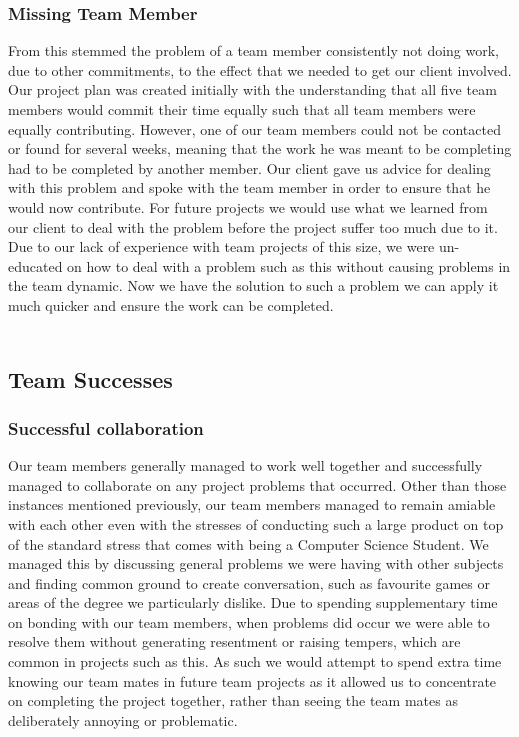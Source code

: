 \documentclass{l3proj}
\begin{document}
\subsubsection{Missing Team Member}
From this stemmed the problem of a team member consistently not doing work, due to other commitments, to the effect that we needed to get our client involved. Our project plan was created initially with the understanding that all five team members would commit their time equally such that all team members were equally contributing. However, one of our team members could not be contacted or found for several weeks, meaning that the work he was meant to be completing had to be completed by another member. Our client gave us advice for dealing with this problem and spoke with the team member in order to ensure that he would now contribute. For future projects we would use what we learned from our client to deal with the problem before the project suffer too much due to it. Due to our lack of experience with team projects of this size, we were un-educated on how to deal with a problem such as this without causing problems in the team dynamic. Now we have the solution to such a problem we can apply it much quicker and ensure the work can be completed. \\
\\

\subsection{Team Successes}

\subsubsection{Successful collaboration}
Our team members generally managed to work well together and successfully managed to collaborate on any project problems that occurred. Other than those instances mentioned previously, our team members managed to remain amiable with each other even with the stresses of conducting such a large product on top of the standard stress that comes with being a Computer Science Student. We managed this by discussing general problems we were having with other subjects and finding common ground to create conversation, such as favourite games or areas of the degree we particularly dislike. Due to spending supplementary time on bonding with our team members, when problems did occur we were able to resolve them without generating resentment or raising tempers, which are common in projects such as this. As such we would attempt to spend extra time knowing our team mates in future team projects as it allowed us to concentrate on completing the project together, rather than seeing the team mates as deliberately annoying or problematic.\\
\\
\end{document}
